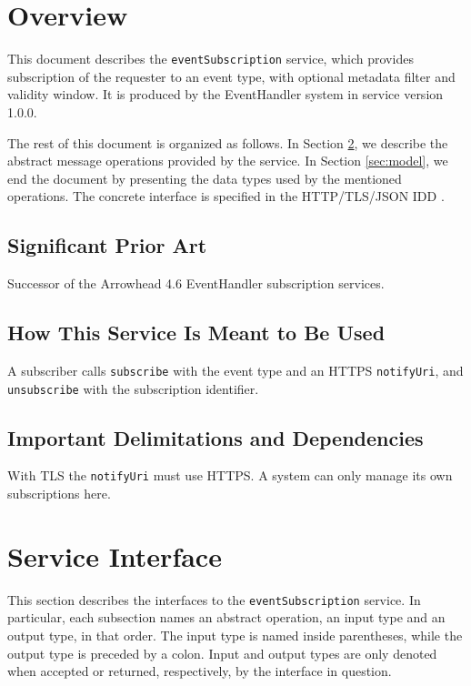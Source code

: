 \documentclass[a4paper]{arrowhead}
\begin{document}
\section{Overview}
\label{sec:overview}

This document describes the \texttt{eventSubscription} service, which provides subscription of the requester to an event type, with optional metadata filter and validity window.
It is produced by the EventHandler system \cite{eh-sysd} in service version 1.0.0.

The rest of this document is organized as follows.
In Section \ref{sec:operations}, we describe the abstract message operations provided by the service.
In Section \ref{sec:model}, we end the document by presenting the data types used by the mentioned operations.
The concrete interface is specified in the HTTP/TLS/JSON IDD \cite{eh-eventSubscription-http-idd}.

\subsection{Significant Prior Art}

Successor of the Arrowhead 4.6 EventHandler subscription services.

\subsection{How This Service Is Meant to Be Used}

A subscriber calls \texttt{subscribe} with the event type and an HTTPS \texttt{notifyUri}, and \texttt{unsubscribe} with the subscription identifier.

\subsection{Important Delimitations and Dependencies}
\label{sec:delimitations}

With TLS the \texttt{notifyUri} must use HTTPS. A system can only manage its own subscriptions here.

\newpage

\section{Service Interface}
\label{sec:operations}

This section describes the interfaces to the \texttt{eventSubscription} service.
In particular, each subsection names an abstract operation, an input type and an output type, in that order.
The input type is named inside parentheses, while the output type is preceded by a colon.
Input and output types are only denoted when accepted or returned, respectively, by the interface in question.
\end{document}
